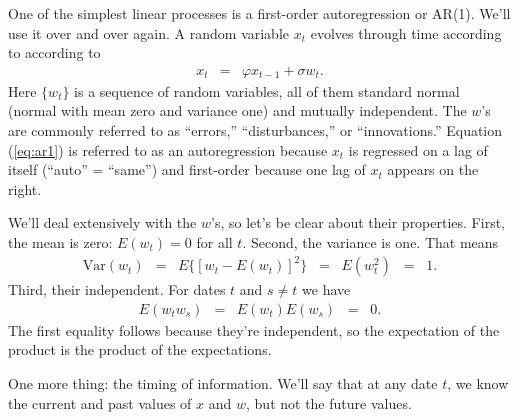 \documentclass[11pt]{article}
\begin{document}
One of the simplest linear processes is a first-order autoregression or AR(1).
We'll use it over and over again.
A random variable $x_t$ evolves through time according to
according to
\begin{eqnarray}
    x_{t} &=& \varphi x_{t-1} + \sigma w_{t} .
    \label{eq:ar1}
\end{eqnarray}
Here $\{ w_t \}$ is a sequence of random variables,
all of them standard normal (normal with mean zero and variance one)
and mutually independent.
The $w$'s are commonly referred to as ``errors,'' ``disturbances,'' or ``innovations.''
Equation (\ref{eq:ar1}) is referred to as an
autoregression because $x_{t}$ is regressed on a lag of itself (``auto'' = ``same'')
and first-order because one lag of $x_{t}$ appears on the right.

We'll deal extensively with the $w$'s, so let's be clear about their properties.
First, the mean is zero:  $E(w_t) = 0 $ for all $t$.
Second, the variance is one.  That means
\begin{eqnarray*}
    \mbox{Var}(w_t) &=& E \big\{ [ w_t - E(w_t)]^2 \big\}
        \;\;=\;\; E ( w_t^2 )  \;\;=\;\; 1.
\end{eqnarray*}
Third, their independent.  For dates $t$ and $s\neq t$ we have
\begin{eqnarray*}
    E(w_t w_s ) &=& E (w_t) E(w_s)  \;\;=\;\; 0.
\end{eqnarray*}
The first equality follows because they're independent, so the expectation
of the product is the product of the expectations.

One more thing:  the timing of information.
We'll say that at any date $t$, we know the current and past values of $x$ and $w$,
but not the future values.
\end{document}
